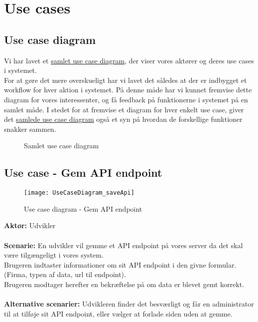 \section{Use cases}
\subsection{Use case diagram}
Vi har lavet et \hyperref[fig:usecase-complete]{samlet use case diagram}, der viser vores aktører og deres use cases i systemet.\\
For at gøre det mere overskueligt har vi lavet det således at der er indbygget et workflow for hver aktion i systemet.
På denne måde har vi kunnet fremvise dette diagram for vores interessenter, og få feedback på funktionerne i systemet på en samlet måde.
I stedet for at fremvise et diagram for hver enkelt use case, giver det \hyperref[fig:usecase-complete]{samlede use case diagram} også et syn på hvordan de forskellige funktioner snakker sammen.
\begin{figure}[H]
    \caption{Samlet use case diagram}
    \label{fig:usecase-complete}
\end{figure}
\subsection{Use case - Gem API endpoint}
\begin{figure}[H]
    \texttt{[image: UseCaseDiagram\_saveApi]}
    \caption{Use case diagram - Gem API endpoint}
    \label{fig:usecase-saveApi}
\end{figure}
\textbf{Aktør:} Udvikler
\\\\
\textbf{Scenarie:} En udvikler vil gemme et API endpoint på vores server da det skal være tilgængeligt i vores system. \\
Brugeren indtaster informationer om sit API endpoint i den givne formular. (Firma, typen af data, url til endpoint). \\
Brugeren modtager herefter en bekræftelse på om data er blevet gemt korrekt.
\\\\
\textbf{Alternative scenarier:} Udvikleren finder det besværligt og får en administrator til at tilføje sit API endpoint,
eller vælger at forlade siden uden at gemme.
